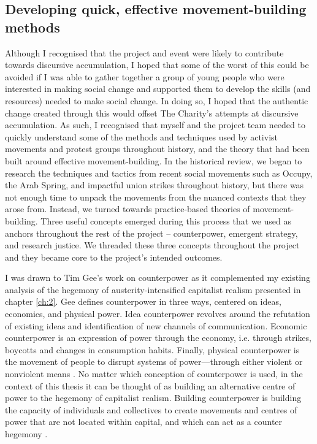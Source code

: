 \subsection{Developing quick, effective movement-building methods}
Although I recognised that the project and event were likely to contribute towards discursive accumulation, I hoped that some of the worst of this could be avoided if I was able to gather together a group of young people who were interested in making social change and supported them to develop the skills (and resources) needed to make social change. In doing so, I hoped that the authentic change created through this would offset The Charity's attempts at discursive accumulation. As such, I recognised that myself and the project team needed to quickly understand some of the methods and techniques used by activist movements and protest groups throughout history, and the theory that had been built around effective movement-building. In the historical review, we began to research the techniques and tactics from recent social movements such as Occupy, the Arab Spring, and impactful union strikes throughout history, but there was not enough time to unpack the movements from the nuanced contexts that they arose from. Instead, we turned towards practice-based theories of movement-building. Three useful concepts emerged during this process that we used as anchors throughout the rest of the project – counterpower, emergent strategy, and research justice. We threaded these three concepts throughout the project and they became core to the project's intended outcomes. 

I was drawn to Tim Gee’s work on counterpower \citep{gee_counterpower:_2011} as it complemented my existing analysis of the hegemony of austerity-intensified capitalist realism presented in chapter \ref{ch:2}.  Gee defines counterpower in three ways, centered on ideas, economics, and physical power. Idea counterpower revolves around the refutation of existing ideas and identification of new channels of communication. Economic counterpower is an expression of power through the economy, i.e. through strikes, boycotts and changes in consumption habits. Finally, physical counterpower is the movement of people to disrupt systems of power—through either violent or nonviolent means \citep[p. 13]{gee_counterpower:_2011}. No matter which conception of counterpower is used, in the context of this thesis it can be thought of as building an alternative centre of power to the hegemony of capitalist realism. Building counterpower is building the capacity of individuals and collectives to create movements and centres of power that are not located within capital, and which can act as a counter hegemony \citep[p. 19]{gee_counterpower:_2011}. 

